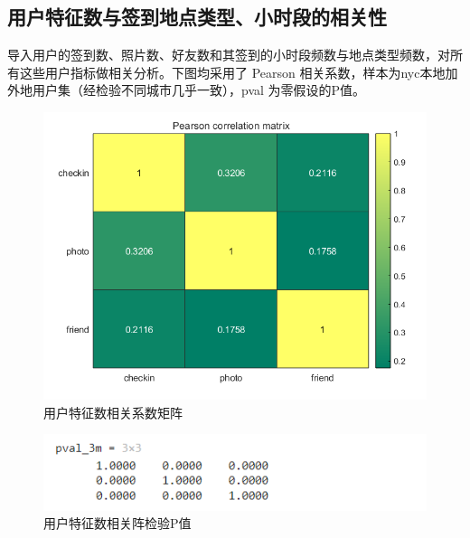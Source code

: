 \documentclass[UTF8]{ctexart}
\begin{document}
		\subsection{用户特征数与签到地点类型、小时段的相关性}
		导入用户的签到数、照片数、好友数和其签到的小时段频数与地点类型频数，对所有这些用户指标做相关分析。下图均采用了 Pearson 相关系数，样本为nyc本地加外地用户集（经检验不同城市几乎一致），pval 为零假设的P值。
		
		\begin{figure}[H]
			\centering
			\includegraphics[scale=0.5]{cor_cpf.png}
			\caption{用户特征数相关系数矩阵}
			\label{cor_cpf}
		\end{figure}
		\begin{figure}[H]
			\centering
			\includegraphics[scale=0.5]{pval_cpf.png}
			\caption{用户特征数相关阵检验P值}
			\label{pval_cpf}
		\end{figure}
	
\end{document}
